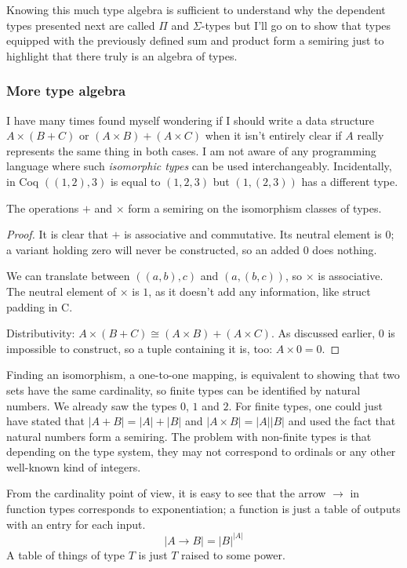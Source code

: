 \documentclass[english, 12pt, a4paper, sci, a-1b, online]{aaltothesis}
\begin{document}
Knowing this much type algebra is sufficient to understand why the dependent types presented next are called $\Pi$ and $\Sigma$-types but I'll go on to show that types equipped with the previously defined sum and product form a semiring just to highlight that there truly is an algebra of types.

\subsubsection{More type algebra}

I have many times found myself wondering if I should write a data structure $A \times (B + C)$ or $(A \times B) + (A \times C)$ when it isn't entirely clear if $A$ really represents the same thing in both cases. I am not aware of any programming language where such \emph{isomorphic types} can be used interchangeably. Incidentally, in Coq $((1, 2), 3)$ is equal to $(1, 2, 3)$ but $(1, (2, 3))$ has a different type.

\begin{theorem}
  The operations $+$ and $\times$ form a semiring on the isomorphism classes of types.
\end{theorem}

\begin{proof}
  It is clear that $+$ is associative and commutative. Its neutral element is $0$; a variant holding zero will never be constructed, so an added $0$ does nothing.

  We can translate between $((a, b), c)$ and $(a, (b, c))$, so $\times$ is associative. The neutral element of $\times$ is $1$, as it doesn't add any information, like struct padding in C.

  Distributivity: $A \times (B + C) \cong (A \times B) + (A \times C)$. As discussed earlier, $0$ is impossible to construct, so a tuple containing it is, too: $A \times 0 = 0$.
\end{proof}

Finding an isomorphism, a one-to-one mapping, is equivalent to showing that two sets have the same cardinality, so finite types can be identified by natural numbers. We already saw the types $0$, $1$ and $2$. For finite types, one could just have stated that $|A + B| = |A| + |B|$ and $|A \times B| = |A||B|$ and used the fact that natural numbers form a semiring. The problem with non-finite types is that depending on the type system, they may not correspond to ordinals or any other well-known kind of integers.

From the cardinality point of view, it is easy to see that the arrow $\to$ in function types corresponds to exponentiation; a function is just a table of outputs with an entry for each input.
\begin{equation*}
  |A \to B| = |B|^{|A|}
\end{equation*}
A table of things of type $T$ is just $T$ raised to some power.
\end{document}
